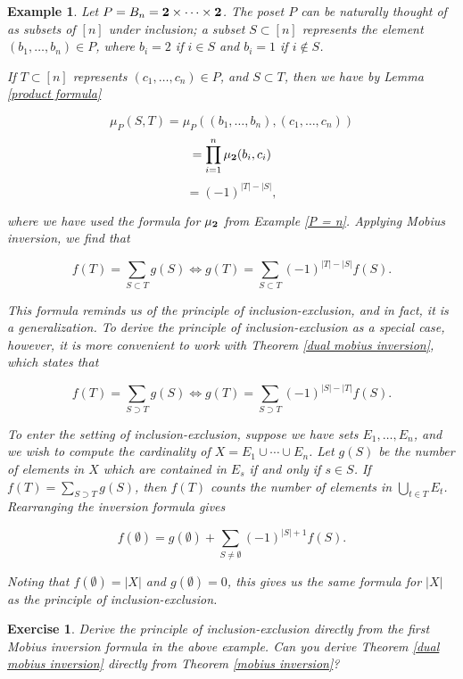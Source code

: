 \documentclass[11pt]{article}
\newtheorem{exercise}[theorem]{Exercise}
\newtheorem{example}[theorem]{Example}
\begin{document}
\begin{example}
Let $P = B_n = {\bf 2} \times \cdots \times {\bf 2}$. The poset $P$
can be naturally thought of as subsets of $[n]$ under inclusion; a
subset $S \subset [n]$ represents the element $(b_1, \ldots , b_n) \in
P$, where $b_i = 2$ if $i \in S$ and $b_i = 1$ if $i \not \in S$. 

If $T \subset [n]$ represents $(c_1, \ldots , c_n) \in P$, and $S
\subset T$, then we have by Lemma \ref{product formula}

\[ \mu_P(S, T) = \mu_P \left( (b_1, \ldots , b_n) , (c_1, \ldots , c_n) \right) \]
\[ = \prod_{i = 1}^n \mu_{\bf 2}(b_i, c_i) \]
\[ = (-1)^{|T| - |S|}, \]

where we have used the formula for $\mu_{\bf 2}$ from Example \ref{P =
  n}. Applying Mobius inversion, we find that

\[ f(T) = \sum_{S \subset T} g(S) \iff g(T) = \sum_{S \subset T} (-1)^{|T| - |S|} f(S). \]

This formula reminds us of the principle of inclusion-exclusion, and
in fact, it is a generalization. To derive the principle of
inclusion-exclusion as a special case, however, it is more convenient
to work with Theorem \ref{dual mobius inversion}, which states that

\[ f(T) = \sum_{S \supset T} g(S) \iff g(T) = \sum_{S \supset T} (-1)^{|S| - |T|} f(S). \]

To enter the setting of inclusion-exclusion, suppose we have sets
$E_1, \ldots , E_n$, and we wish to compute the cardinality of $X =
E_1 \cup \cdots \cup E_n$. Let $g(S)$ be the number of elements in $X$
which are contained in $E_s$ if and only if $s \in S$. If $f(T) =
\sum_{S \supset T} g(S)$, then $f(T)$ counts the number of elements in
$\bigcup_{t \in T} E_t$. Rearranging the inversion formula gives

\[ f(\emptyset) = g(\emptyset) + \sum_{S \ne \emptyset} (-1)^{|S| + 1} f(S). \]

Noting that $f(\emptyset) = |X|$ and $g(\emptyset) = 0$, this gives us
the same formula for $|X|$ as the principle of inclusion-exclusion.
\end{example}

\begin{exercise}
Derive the principle of inclusion-exclusion directly from the first
Mobius inversion formula in the above example. Can you derive Theorem
\ref{dual mobius inversion} directly from Theorem \ref{mobius
  inversion}?
\end{exercise}
\end{document}
